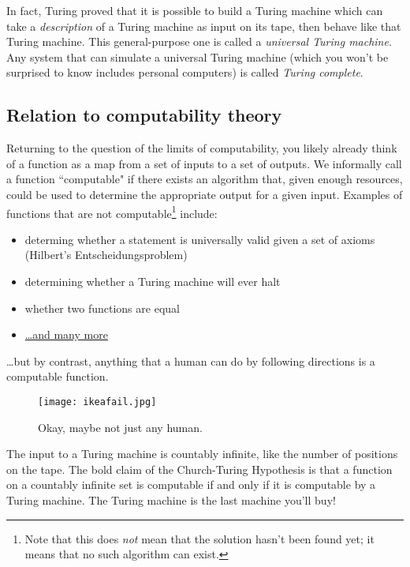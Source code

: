 \documentclass{article}
\begin{document}
In fact, Turing proved that it is possible to build a Turing machine which can take a \textit{description} of a Turing machine as input on its tape, then behave like that Turing machine. This general-purpose one is called a \textit{universal Turing machine}. Any system that can simulate a universal Turing machine (which you won't be surprised to know includes personal computers) is called \textit{Turing complete}.\\

\subsection*{Relation to computability theory}

Returning to the question of the limits of computability, you likely already think of a function as a map from a set of inputs to a set of outputs. We informally call a function ``computable" if there exists an algorithm that, given enough resources, could be used to determine the appropriate output for a given input. Examples of functions that are not computable\footnote{Note that this does \textit{not} mean that the solution hasn't been found yet; it means that no such algorithm can exist.} include:
\begin{itemize}
\item determing whether a statement is universally valid given a set of axioms (Hilbert's Entscheidungsproblem)
\item determining whether a Turing machine will ever halt
\item whether two functions are equal
\item \href{http://en.wikipedia.org/wiki/List_of_undecidable_problems}{\ldots and many more}
\end{itemize}
\ldots but by contrast, anything that a human can do by following directions is a computable function.\\

\begin{figure}[ht!]
\centering
\texttt{[image: ikeafail.jpg]}
\caption{Okay, maybe not just any human.}
\end{figure}

The input to a Turing machine is countably infinite, like the number of positions on the tape. The bold claim of the Church-Turing Hypothesis is that a function on a countably infinite set is computable if and only if it is computable by a Turing machine. The Turing machine is the last machine you'll buy!\\
\end{document}
